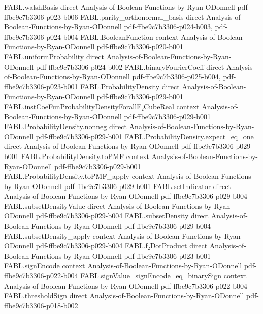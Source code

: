 \begin{theorem}
\proofstep
  {FABL.walshBasis}
  {direct}
  {Analysis-of-Boolean-Functions-by-Ryan-ODonnell}
  {pdf-ffbe9c7b3306-p023-b006}
\proofstep
  {FABL.parity_orthonormal_basis}
  {direct}
  {Analysis-of-Boolean-Functions-by-Ryan-ODonnell}
  {pdf-ffbe9c7b3306-p024-b003,
    pdf-ffbe9c7b3306-p024-b004}
\proofstep
  {FABL.BooleanFunction}
  {context}
  {Analysis-of-Boolean-Functions-by-Ryan-ODonnell}
  {pdf-ffbe9c7b3306-p020-b001}
\proofstep
  {FABL.uniformProbability}
  {direct}
  {Analysis-of-Boolean-Functions-by-Ryan-ODonnell}
  {pdf-ffbe9c7b3306-p024-b002}
\proofstep
  {FABL.binaryFourierCoeff}
  {direct}
  {Analysis-of-Boolean-Functions-by-Ryan-ODonnell}
  {pdf-ffbe9c7b3306-p025-b004,
    pdf-ffbe9c7b3306-p023-b001}
\proofstep
  {FABL.ProbabilityDensity}
  {direct}
  {Analysis-of-Boolean-Functions-by-Ryan-ODonnell}
  {pdf-ffbe9c7b3306-p029-b001}
\proofstep
  {FABL.instCoeFunProbabilityDensityForallF₂CubeReal}
  {context}
  {Analysis-of-Boolean-Functions-by-Ryan-ODonnell}
  {pdf-ffbe9c7b3306-p029-b001}
\proofstep
  {FABL.ProbabilityDensity.nonneg}
  {direct}
  {Analysis-of-Boolean-Functions-by-Ryan-ODonnell}
  {pdf-ffbe9c7b3306-p029-b001}
\proofstep
  {FABL.ProbabilityDensity.expect_eq_one}
  {direct}
  {Analysis-of-Boolean-Functions-by-Ryan-ODonnell}
  {pdf-ffbe9c7b3306-p029-b001}
\proofstep
  {FABL.ProbabilityDensity.toPMF}
  {context}
  {Analysis-of-Boolean-Functions-by-Ryan-ODonnell}
  {pdf-ffbe9c7b3306-p029-b001}
\proofstep
  {FABL.ProbabilityDensity.toPMF_apply}
  {context}
  {Analysis-of-Boolean-Functions-by-Ryan-ODonnell}
  {pdf-ffbe9c7b3306-p029-b001}
\proofstep
  {FABL.setIndicator}
  {direct}
  {Analysis-of-Boolean-Functions-by-Ryan-ODonnell}
  {pdf-ffbe9c7b3306-p029-b004}
\proofstep
  {FABL.subsetDensityValue}
  {direct}
  {Analysis-of-Boolean-Functions-by-Ryan-ODonnell}
  {pdf-ffbe9c7b3306-p029-b004}
\proofstep
  {FABL.subsetDensity}
  {direct}
  {Analysis-of-Boolean-Functions-by-Ryan-ODonnell}
  {pdf-ffbe9c7b3306-p029-b004}
\proofstep
  {FABL.subsetDensity_apply}
  {context}
  {Analysis-of-Boolean-Functions-by-Ryan-ODonnell}
  {pdf-ffbe9c7b3306-p029-b004}
\proofstep
  {FABL.f₂DotProduct}
  {direct}
  {Analysis-of-Boolean-Functions-by-Ryan-ODonnell}
  {pdf-ffbe9c7b3306-p023-b001}
\proofstep
  {FABL.signEncode}
  {context}
  {Analysis-of-Boolean-Functions-by-Ryan-ODonnell}
  {pdf-ffbe9c7b3306-p022-b004}
\proofstep
  {FABL.signValue_signEncode_eq_binarySign}
  {context}
  {Analysis-of-Boolean-Functions-by-Ryan-ODonnell}
  {pdf-ffbe9c7b3306-p022-b004}
\proofstep
  {FABL.thresholdSign}
  {direct}
  {Analysis-of-Boolean-Functions-by-Ryan-ODonnell}
  {pdf-ffbe9c7b3306-p018-b002}

\end{theorem}
